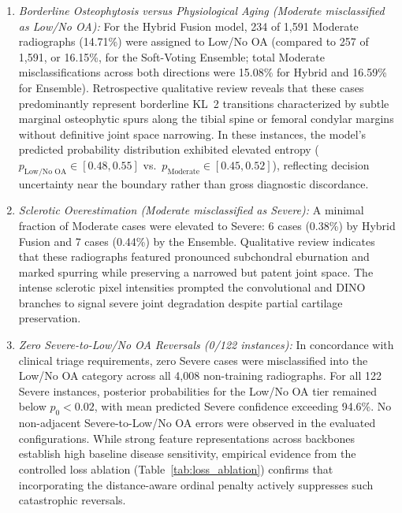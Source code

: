\documentclass[10pt,journal]{IEEEtran}
\begin{document}
\begin{enumerate}[leftmargin=*]
\item \textit{Borderline Osteophytosis versus Physiological Aging (Moderate misclassified as Low/No OA):} For the Hybrid Fusion model, 234 of 1,591 Moderate radiographs (14.71\%) were assigned to Low/No OA (compared to 257 of 1,591, or 16.15\%, for the Soft-Voting Ensemble; total Moderate misclassifications across both directions were 15.08\% for Hybrid and 16.59\% for Ensemble). Retrospective qualitative review reveals that these cases predominantly represent borderline KL~2 transitions characterized by subtle marginal osteophytic spurs along the tibial spine or femoral condylar margins without definitive joint space narrowing. In these instances, the model's predicted probability distribution exhibited elevated entropy ($p_{\text{Low/No OA}} \in [0.48, 0.55]$ vs.\ $p_{\text{Moderate}} \in [0.45, 0.52]$), reflecting decision uncertainty near the boundary rather than gross diagnostic discordance.
\item \textit{Sclerotic Overestimation (Moderate misclassified as Severe):} A minimal fraction of Moderate cases were elevated to Severe: 6 cases (0.38\%) by Hybrid Fusion and 7 cases (0.44\%) by the Ensemble. Qualitative review indicates that these radiographs featured pronounced subchondral eburnation and marked spurring while preserving a narrowed but patent joint space. The intense sclerotic pixel intensities prompted the convolutional and DINO branches to signal severe joint degradation despite partial cartilage preservation.
\item \textit{Zero Severe-to-Low/No OA Reversals (0/122 instances):} In concordance with clinical triage requirements, zero Severe cases were misclassified into the Low/No OA category across all 4,008 non-training radiographs. For all 122 Severe instances, posterior probabilities for the Low/No OA tier remained below $p_0 < 0.02$, with mean predicted Severe confidence exceeding 94.6\%. No non-adjacent Severe-to-Low/No OA errors were observed in the evaluated configurations. While strong feature representations across backbones establish high baseline disease sensitivity, empirical evidence from the controlled loss ablation (Table~\ref{tab:loss_ablation}) confirms that incorporating the distance-aware ordinal penalty actively suppresses such catastrophic reversals.
\end{enumerate}


\FloatBarrier
\end{document}
